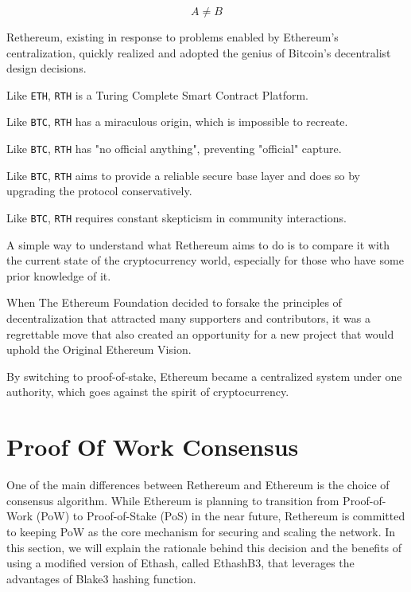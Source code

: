 \documentclass[a4paper,onecolumn, superscriptaddress,10pt,accepted=2020-05-01,issue=1, volume=2, shorttitle=papers]{compositionalityarticle}
\begin{document}
\begin{equation}
  A \neq B
\end{equation}

    Rethereum, existing in response to problems enabled by Ethereum's centralization, quickly realized and adopted the genius of Bitcoin's decentralist design decisions.

\vspace{0.5cm}
    
    Like \texttt{ETH}, \texttt{RTH} is a Turing Complete Smart Contract Platform.
    
    Like \texttt{BTC}, \texttt{RTH} has a miraculous origin, which is impossible to recreate.
    
    Like \texttt{BTC}, \texttt{RTH} has "no official anything", preventing "official" capture.
    
    Like \texttt{BTC}, \texttt{RTH} aims to provide a reliable secure base layer and does so by upgrading the protocol conservatively.
    
    Like \texttt{BTC}, \texttt{RTH} requires constant skepticism in community interactions.
    
\vspace{1cm}

    A simple way to understand what Rethereum aims to do is to compare it with the current state of the cryptocurrency world, especially for those who have some prior knowledge of it.

When The Ethereum Foundation decided to forsake the principles of decentralization that attracted many supporters and contributors, it was a regrettable move that also created an opportunity for a new project that would uphold the Original Ethereum Vision.

By switching to proof-of-stake, Ethereum became a centralized system under one authority, which goes against the spirit of cryptocurrency.

\section{Proof Of Work Consensus}

One of the main differences between Rethereum and Ethereum is the choice of consensus algorithm. While Ethereum is planning to transition from Proof-of-Work (PoW) to Proof-of-Stake (PoS) in the near future, Rethereum is committed to keeping PoW as the core mechanism for securing and scaling the network. In this section, we will explain the rationale behind this decision and the benefits of using a modified version of Ethash, called EthashB3, that leverages the advantages of Blake3 hashing function.
\end{document}
